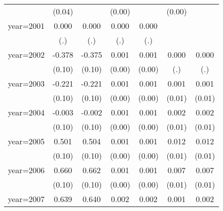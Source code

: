 {\begin{tabular}{l*{6}{c}}
                    &      (0.04)         &                     &      (0.00)         &                     &      (0.00)         &                     \\
year=2001           &       0.000         &       0.000         &       0.000         &       0.000         &                     &                     \\
                    &         (.)         &         (.)         &         (.)         &         (.)         &                     &                     \\
year=2002           &      -0.378\sym{***}&      -0.375\sym{***}&       0.001         &       0.001         &       0.000         &       0.000         \\
                    &      (0.10)         &      (0.10)         &      (0.00)         &      (0.00)         &         (.)         &         (.)         \\
year=2003           &      -0.221\sym{*}  &      -0.221\sym{*}  &       0.001         &       0.001         &       0.001         &       0.001         \\
                    &      (0.10)         &      (0.10)         &      (0.00)         &      (0.00)         &      (0.01)         &      (0.01)         \\
year=2004           &      -0.003         &      -0.002         &       0.001         &       0.001         &       0.002         &       0.002         \\
                    &      (0.10)         &      (0.10)         &      (0.00)         &      (0.00)         &      (0.01)         &      (0.01)         \\
year=2005           &       0.501\sym{***}&       0.504\sym{***}&       0.001         &       0.001         &       0.012         &       0.012         \\
                    &      (0.10)         &      (0.10)         &      (0.00)         &      (0.00)         &      (0.01)         &      (0.01)         \\
year=2006           &       0.660\sym{***}&       0.662\sym{***}&       0.001         &       0.001         &       0.007         &       0.007         \\
                    &      (0.10)         &      (0.10)         &      (0.00)         &      (0.00)         &      (0.01)         &      (0.01)         \\
year=2007           &       0.639\sym{***}&       0.640\sym{***}&       0.002\sym{*}  &       0.002         &       0.001         &       0.002         \\

\end{tabular}}
